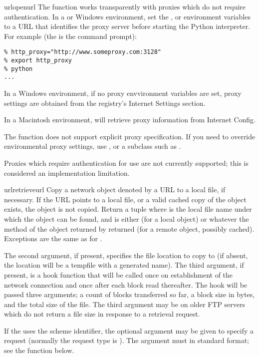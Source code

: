 \begin{funcdesc}{urlopen}{url}
The  function works transparently with proxies
which do not require authentication.  In a \UNIX{} or Windows
environment, set the ,  or
 environment variables to a URL that identifies
the proxy server before starting the Python interpreter.  For example
(the \character{\%} is the command prompt):

\begin{verbatim}
% http_proxy="http://www.someproxy.com:3128"
% export http_proxy
% python
...
\end{verbatim}

In a Windows environment, if no proxy envvironment variables are set,
proxy settings are obtained from the registry's Internet Settings
section.

In a Macintosh environment,  will retrieve proxy
information from Internet Config.

The  function does not support explicit proxy
specification.  If you need to override environmental proxy settings,
use , or a subclass such as .

Proxies which require authentication for use are not currently
supported; this is considered an implementation limitation.
\end{funcdesc}

\begin{funcdesc}{urlretrieve}{url}
Copy a network object denoted by a URL to a local file, if necessary.
If the URL points to a local file, or a valid cached copy of the
object exists, the object is not copied.  Return a tuple
 where  is the
local file name under which the object can be found, and 
is either  (for a local object) or whatever the
 method of the object returned by 
returned (for a remote object, possibly cached).  Exceptions are the
same as for .

The second argument, if present, specifies the file location to copy
to (if absent, the location will be a tempfile with a generated name).
The third argument, if present, is a hook function that will be called
once on establishment of the network connection and once after each
block read thereafter.  The hook will be passed three arguments; a
count of blocks transferred so far, a block size in bytes, and the
total size of the file.  The third argument may be  on older
FTP servers which do not return a file size in response to a retrieval 
request.

If the  uses the  scheme identifier, the optional
 argument may be given to specify a  request
(normally the request type is ).  The  argument
must in standard  format;
see the  function below.
\end{funcdesc}

